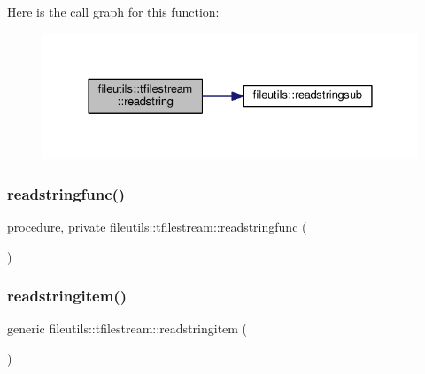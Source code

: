 Here is the call graph for this function\+:
\nopagebreak
\begin{figure}[H]
\begin{center}
\leavevmode
\includegraphics[width=328pt]{structfileutils_1_1tfilestream_a93683194f64760a507d8b22afb0d311b_cgraph}
\end{center}
\end{figure}
\mbox{\label{structfileutils_1_1tfilestream_acda5e8c36e6b9f7291018f3de5625d50}} 
\subsubsection{\texorpdfstring{readstringfunc()}{readstringfunc()}}
{\footnotesize\ttfamily procedure, private fileutils\+::tfilestream\+::readstringfunc (\begin{DoxyParamCaption}{ }\end{DoxyParamCaption})\hspace{0.3cm}{\ttfamily [private]}}

\mbox{\label{structfileutils_1_1tfilestream_a256bf925db8f74144f916aa3a23f11d9}} 
\subsubsection{\texorpdfstring{readstringitem()}{readstringitem()}}
{\footnotesize\ttfamily generic fileutils\+::tfilestream\+::readstringitem (\begin{DoxyParamCaption}{ }\end{DoxyParamCaption})\hspace{0.3cm}{\ttfamily [private]}}




